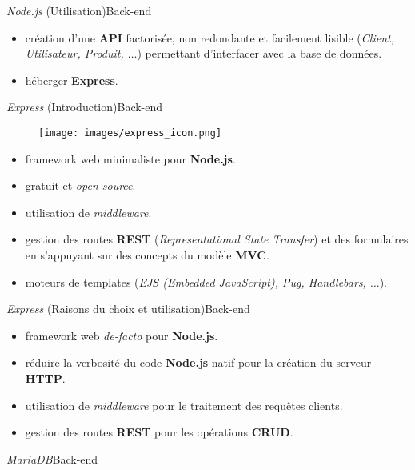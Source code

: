 \documentclass[usenames,dvipsnames]{beamer}
\begin{document}
\begin{frame}{\textit{Node.js} (Utilisation)}{Back-end}
  \begin{itemize}
    \item création d'une \textbf{API} factorisée, non redondante et facilement lisible (\textit{Client, Utilisateur, Produit, $\dots$}) permettant d'interfacer avec la base de données.
    \item héberger \textbf{Express}.
  \end{itemize}
\end{frame}

\begin{frame}{\textit{Express} (Introduction)}{Back-end}
  \begin{figure}[!ht]
    \centering
    \texttt{[image: images/express\_icon.png]}
  \end{figure}

  \begin{itemize}
    \item framework web minimaliste pour \textbf{Node.js}.
    \item gratuit et \textit{open-source}.
    \item utilisation de \textit{middleware}.
    \item gestion des routes \textbf{REST} (\textit{Representational State Transfer}) et des formulaires en s'appuyant sur des concepts du modèle \textbf{MVC}.
    \item moteurs de templates (\textit{EJS (Embedded JavaScript), Pug, Handlebars, $\dots$}).
  \end{itemize}
\end{frame}

\begin{frame}{\textit{Express} (Raisons du choix et utilisation)}{Back-end}
  \begin{itemize}
    \item framework web \textit{de-facto} pour \textbf{Node.js}.
    \item réduire la verbosité du code \textbf{Node.js} natif pour la création du serveur \textbf{HTTP}.
    \item utilisation de \textit{middleware} pour le traitement des requêtes clients.
    \item gestion des routes \textbf{REST} pour les opérations \textbf{CRUD}.
  \end{itemize}
\end{frame}

\begin{frame}{\textit{MariaDB}}{Back-end}

\end{frame}
\end{document}
